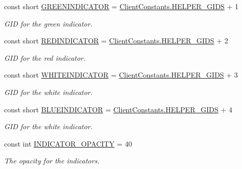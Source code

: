 \begin{DoxyCompactItemize}
\item 
const short \hyperlink{classClient_1_1Common_1_1Constants_1_1HelperSpritesGid_ac596caabc3769ddfec43aa6360d95715}{G\+R\+E\+E\+N\+I\+N\+D\+I\+C\+A\+T\+O\+R} = \hyperlink{classClient_1_1Common_1_1Constants_1_1ClientConstants_abdbce6edd33fb85723b04b8338fa9ba8}{Client\+Constants.\+H\+E\+L\+P\+E\+R\+\_\+\+G\+I\+D\+S} + 1
\begin{DoxyCompactList}\small\item\em G\+I\+D for the green indicator. \end{DoxyCompactList}\item 
const short \hyperlink{classClient_1_1Common_1_1Constants_1_1HelperSpritesGid_a07a6a82ffd0b18370c5321d648c954d5}{R\+E\+D\+I\+N\+D\+I\+C\+A\+T\+O\+R} = \hyperlink{classClient_1_1Common_1_1Constants_1_1ClientConstants_abdbce6edd33fb85723b04b8338fa9ba8}{Client\+Constants.\+H\+E\+L\+P\+E\+R\+\_\+\+G\+I\+D\+S} + 2
\begin{DoxyCompactList}\small\item\em G\+I\+D for the red indicator. \end{DoxyCompactList}\item 
const short \hyperlink{classClient_1_1Common_1_1Constants_1_1HelperSpritesGid_a38d81594f0e9a6780a3e63096003d9f1}{W\+H\+I\+T\+E\+I\+N\+D\+I\+C\+A\+T\+O\+R} = \hyperlink{classClient_1_1Common_1_1Constants_1_1ClientConstants_abdbce6edd33fb85723b04b8338fa9ba8}{Client\+Constants.\+H\+E\+L\+P\+E\+R\+\_\+\+G\+I\+D\+S} + 3
\begin{DoxyCompactList}\small\item\em G\+I\+D for the white indicator. \end{DoxyCompactList}\item 
const short \hyperlink{classClient_1_1Common_1_1Constants_1_1HelperSpritesGid_ad82a28d98b8e1e3e8986fa33b4305f54}{B\+L\+U\+E\+I\+N\+D\+I\+C\+A\+T\+O\+R} = \hyperlink{classClient_1_1Common_1_1Constants_1_1ClientConstants_abdbce6edd33fb85723b04b8338fa9ba8}{Client\+Constants.\+H\+E\+L\+P\+E\+R\+\_\+\+G\+I\+D\+S} + 4
\begin{DoxyCompactList}\small\item\em G\+I\+D for the white indicator. \end{DoxyCompactList}\item 
const int \hyperlink{classClient_1_1Common_1_1Constants_1_1HelperSpritesGid_a6c608d03a26c1c9970bc0c1fac4130d1}{I\+N\+D\+I\+C\+A\+T\+O\+R\+\_\+\+O\+P\+A\+C\+I\+T\+Y} = 40
\begin{DoxyCompactList}\small\item\em The opacity for the indicators. \end{DoxyCompactList}\end{DoxyCompactItemize}


